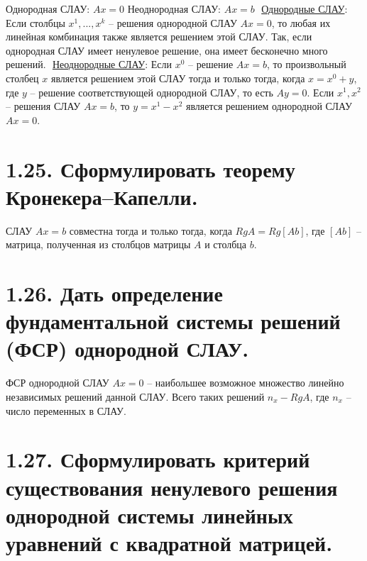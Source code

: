 \documentclass{article}
\begin{document}
Однородная СЛАУ: $Ax = 0$
\newline Неоднородная СЛАУ: $Ax = b$
\newline $ $
\newline \underline{Однородные СЛАУ}:
\newline Если столбцы $x^1, ..., x^k$ -- решения однородной СЛАУ $Ax = 0$, то любая их линейная комбинация также является решением этой СЛАУ. Так, если однородная СЛАУ имеет ненулевое решение, она имеет бесконечно много решений.
\newline $ $
\newline \underline{Неоднородные СЛАУ}:
\newline Если $x^0$ -- решение $Ax = b$, то произвольный столбец $x$ является решением этой СЛАУ тогда и только тогда, когда $x = x^0 + y$, где $y$ -- решение соответствующей однородной СЛАУ, то есть $Ay = 0$.
\newline Если $x^1, x^2$ -- решения СЛАУ $Ax = b$, то $y = x^1 - x^2$ является решением однородной СЛАУ $Ax = 0$.

\section*{\LARGE 1.25. Сформулировать теорему Кронекера–Капелли.  }

СЛАУ $Ax = b$ совместна тогда и только тогда, когда $RgA = Rg[Ab]$, где $[Ab]$ -- матрица, полученная из столбцов матрицы $A$ и столбца $b$. 

\section*{\LARGE 1.26. Дать определение фундаментальной системы решений (ФСР) однородной СЛАУ. }

ФСР однородной СЛАУ $Ax = 0$ -- наибольшее возможное множество линейно независимых решений данной СЛАУ. Всего таких решений $n_x -  RgA$, где $n_x$ -- число переменных в СЛАУ.

\section*{\LARGE 1.27. Сформулировать критерий существования ненулевого решения однородной системы линейных уравнений с квадратной матрицей. }
\end{document}
